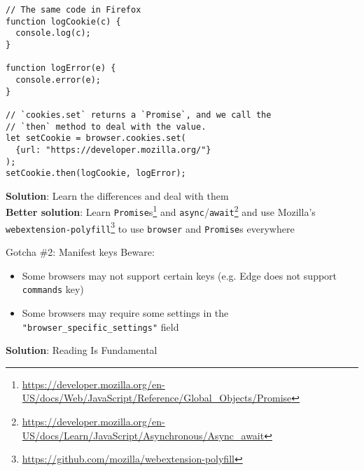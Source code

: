 \documentclass[../index.tex]{subfiles}
\begin{document}
\begin{frame}[fragile]{\currenttitle}
  \begin{lstlisting}[language=ES6]
// The same code in Firefox
function logCookie(c) {
  console.log(c);
}

function logError(e) {
  console.error(e);
}

// `cookies.set` returns a `Promise`, and we call the
// `then` method to deal with the value.
let setCookie = browser.cookies.set(
  {url: "https://developer.mozilla.org/"}
);
setCookie.then(logCookie, logError);
  \end{lstlisting}
\end{frame}

\newcommand{\promisesfootnote}{\footnote{\url{https://developer.mozilla.org/en-US/docs/Web/JavaScript/Reference/Global_Objects/Promise}}}
\newcommand{\asyncfootnote}{\footnote{\url{https://developer.mozilla.org/en-US/docs/Learn/JavaScript/Asynchronous/Async_await}}}
\newcommand{\polyfillfootnote}{\footnote{\url{https://github.com/mozilla/webextension-polyfill}}}
\begin{frame}[fragile]{\currenttitle}
  \textbf{Solution}: Learn the differences and deal with them \\[1em]

  \textbf{Better solution}: Learn \texttt{Promise}s\promisesfootnote{}
  and \texttt{async}/\texttt{await}\asyncfootnote{}
  and use Mozilla's \texttt{webextension-polyfill}\polyfillfootnote{}
  to use \texttt{browser} and \texttt{Promise}s everywhere
\end{frame}

\renewcommand{\currenttitle}{Gotcha \#2: Manifest keys}
\begin{frame}[fragile]{\currenttitle}
  Beware:
  \begin{itemize}
    \item Some browsers may not support certain keys\footnotemark{} (e.g. Edge does not
          support \texttt{commands} key)
    \item Some browsers may require some settings in the \texttt{"browser\_specific\_settings"} field
  \end{itemize}

  \vspace*{1em}
  \textbf{Solution}: Reading Is Fundamental
\end{frame}

\end{document}
